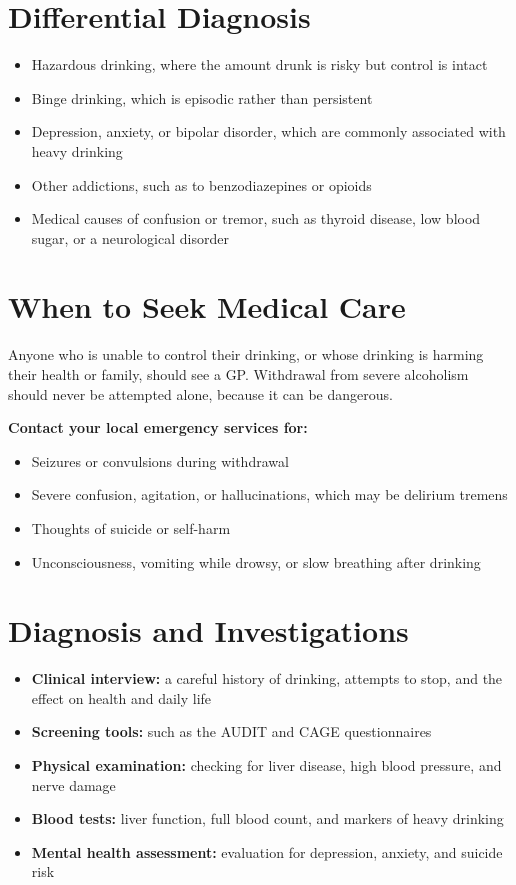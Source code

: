 \section*{Differential Diagnosis}
\begin{itemize}
    \item Hazardous drinking, where the amount drunk is risky but control is intact
    \item Binge drinking, which is episodic rather than persistent
    \item Depression, anxiety, or bipolar disorder, which are commonly associated with heavy drinking
    \item Other addictions, such as to benzodiazepines or opioids
    \item Medical causes of confusion or tremor, such as thyroid disease, low blood sugar, or a neurological disorder
\end{itemize}

\section*{When to Seek Medical Care}
Anyone who is unable to control their drinking, or whose drinking is harming their health or family, should see a GP. Withdrawal from severe alcoholism should never be attempted alone, because it can be dangerous.

\textbf{Contact your local emergency services for:}
\begin{itemize}
    \item Seizures or convulsions during withdrawal
    \item Severe confusion, agitation, or hallucinations, which may be delirium tremens
    \item Thoughts of suicide or self-harm
    \item Unconsciousness, vomiting while drowsy, or slow breathing after drinking
\end{itemize}

\section*{Diagnosis and Investigations}
\begin{itemize}
    \item \textbf{Clinical interview:} a careful history of drinking, attempts to stop, and the effect on health and daily life
    \item \textbf{Screening tools:} such as the AUDIT and CAGE questionnaires
    \item \textbf{Physical examination:} checking for liver disease, high blood pressure, and nerve damage
    \item \textbf{Blood tests:} liver function, full blood count, and markers of heavy drinking
    \item \textbf{Mental health assessment:} evaluation for depression, anxiety, and suicide risk
\end{itemize}

